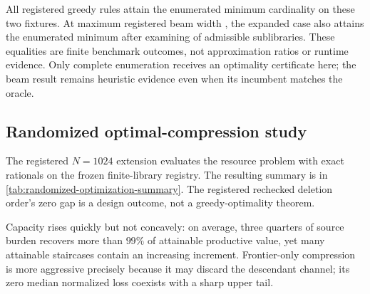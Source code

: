 \begin{table}[htbp]
\centering
\small
\AORApproximateCompressionTable
\caption{Exact tolerance-based compression fixtures. Removed shares and
losses are exact fractions. ``IP LB'' is the operational-cover cardinality
lower bound from the dependency-free 0--1 formulation; it is not a solver
status or a complete certificate for the generative constraint.}
\label{tab:aor-approximate-compression}
\end{table}

All registered greedy rules attain the enumerated minimum cardinality on
these two fixtures. At maximum registered beam width
\AORApproximateMaximumBeamWidth{}, the expanded case also attains the
enumerated minimum after examining \AORApproximateExpandedBeamEvaluated{} of
\AORApproximateExpandedSubsets{} admissible sublibraries. These equalities are
finite benchmark outcomes, not approximation ratios or runtime evidence. Only
complete enumeration receives an optimality certificate here; the beam result
remains heuristic evidence even when its incumbent matches the oracle.

\subsection{Randomized optimal-compression study}

The registered $N=1024$ extension evaluates the resource problem with exact
rationals on the frozen finite-library registry.  The resulting summary is in
\cref{tab:randomized-optimization-summary}.  The registered rechecked deletion
order's zero gap is a design outcome, not a greedy-optimality theorem.

\begin{table}[htbp]
\centering
\small

\caption{Randomized optimal-compression outcomes.  Fractions and integer
counts are exact.  A leading \(\approx\) marks a decimal rendered from an exact
across-trial rational mean; the committed source tables retain the full
fractions and every optimizer tie.  Frequencies describe the registered finite
generator, not a real-library population.}
\label{tab:randomized-optimization-summary}
\end{table}

Capacity rises quickly but not concavely: on average, three quarters of source
burden recovers more than $99\%$ of attainable productive value, yet many
attainable staircases contain an increasing increment.
Frontier-only compression is more aggressive precisely because it may discard
the descendant channel; its zero median normalized loss coexists with a sharp
upper tail.

